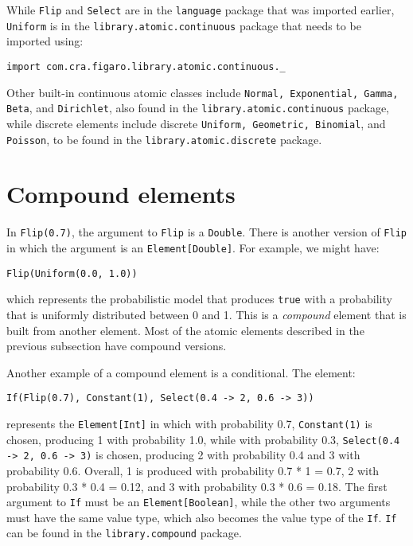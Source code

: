 While \texttt{Flip} and \texttt{Select} are in the \texttt{language} package that was imported earlier, \texttt{Uniform} is in the \texttt{library.atomic.continuous} package that needs to be imported using:
 
\begin{flushleft}
\texttt{import com.cra.figaro.library.atomic.continuous.\_}
\end{flushleft}

Other built-in continuous atomic classes include \texttt{Normal, Exponent\-ial, Gamma, Beta}, and \texttt{Dirichlet}, also found in the \texttt{library.atomic.\-continuous} package, while discrete elements include discrete \texttt{Uniform, Geometric, Binomial}, and \texttt{Poisson}, to be found in the \texttt{library.atom\-ic.discrete} package.

\section{Compound elements}

In \texttt{Flip(0.7)}, the argument to \texttt{Flip} is a \texttt{Double}. There is another version of \texttt{Flip} in which the argument is an \texttt{Element[Double]}. For example, we might have:

\begin{flushleft}
\texttt{Flip(Uniform(0.0, 1.0))}
\end{flushleft}

which represents the probabilistic model that produces \texttt{true} with a probability that is uniformly distributed between 0 and 1. This is a \emph{compound} element that is built from another element. Most of the atomic elements described in the previous subsection have compound versions.

Another example of a compound element is a conditional. The element:

\begin{flushleft}
\texttt{If(Flip(0.7), Constant(1), Select(0.4 -> 2, 0.6 -> 3))}
\end{flushleft}

represents the \texttt{Element[Int]} in which with probability 0.7, \texttt{Constant\-(1)} is chosen, producing 1 with probability 1.0, while with probability 0.3, \texttt{Select(0.4
-> 2, 0.6 -> 3)} is chosen, producing 2 with probability 0.4 and 3 with probability 0.6. Overall, 1 is produced with probability 0.7 * 1 = 0.7, 2 with probability 0.3 * 0.4 = 0.12, and 3 with probability 0.3 * 0.6 = 0.18. The first argument to \texttt{If} must be an \texttt{Element[Boolean]}, while the other two arguments must have the same value type, which also becomes the value type of the \texttt{If}. \texttt{If} can be found in the \texttt{library.compound} package. 

